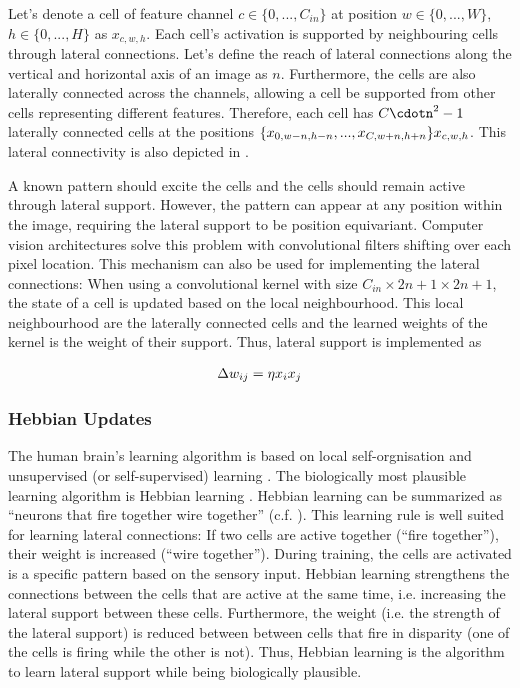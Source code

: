 Let's denote a cell of feature channel $c \in \{0, ..., C_{in}\}$ at position $w \in \{0, ..., W\}$, $h \in \{0, ..., H\}$ as $x_{c,w,h}$.
Each cell's activation is supported by neighbouring cells through lateral connections. Let's define the reach of lateral connections along the vertical and horizontal axis of an image as $n$.
Furthermore, the cells are also laterally connected across the channels, allowing a cell be supported from other cells representing different features.
Therefore, each cell has $C\cdotn^2 - 1$ laterally connected cells at the positions $\{x_{0,w-n,h-n}, ..., x_{C,w+n,h+n}\} \\ x_{c,w,h}$. This lateral connectivity is also depicted in . 

A known pattern should excite the cells and the cells should remain active through lateral support. 
However, the pattern can appear at any position within the image, requiring the lateral support to be position equivariant.
Computer vision architectures solve this problem with convolutional filters shifting over each pixel location. This mechanism can also be used for implementing the lateral connections: When using a convolutional kernel with size $C_{in} \times 2n+1 \times 2n+1$, the state of a cell is updated based on the local neighbourhood. This local neighbourhood are the laterally connected cells and the learned weights of the kernel is the weight of their support.
Thus, lateral support is implemented as


\begin{align}\eqlbl{convlat_1}
	\Delta w_{ij} = \eta x_i x_j
\end{align}


\subsubsection{Hebbian Updates}
The human brain's learning algorithm is based on local self-orgnisation and unsupervised (or self-supervised) learning . The biologically most plausible learning algorithm is Hebbian learning . Hebbian learning can be summarized as ``neurons that fire together wire together'' (c.f. ).
This learning rule is well suited for learning lateral connections: If two cells are active together (``fire together''), their weight is increased (``wire together''). During training, the cells are activated is a specific pattern based on the sensory input. Hebbian learning strengthens the connections between the cells that are active at the same time, i.e. increasing the lateral support between these cells. Furthermore, the weight (i.e. the strength of the lateral support) is reduced between between cells that fire in disparity (one of the cells is firing while the other is not).
Thus, Hebbian learning is the algorithm to learn lateral support while being biologically plausible.


